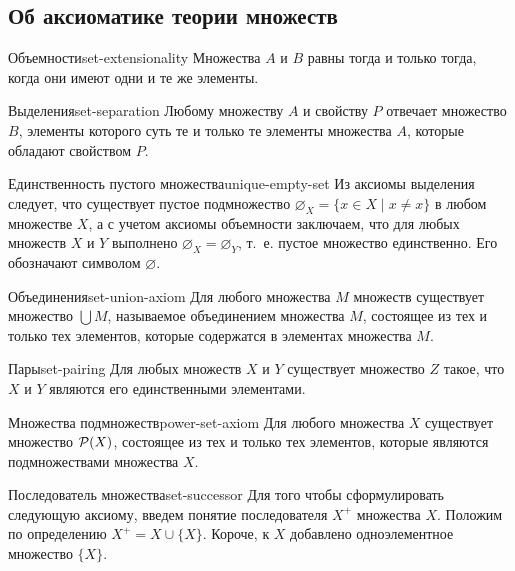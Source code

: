 \subsection{Об аксиоматике теории множеств}

\begin{axiom}{Объемности}{set-extensionality}
  Множества $A$ и $B$ равны тогда и только тогда, когда они имеют одни и те
  же элементы.
\end{axiom}

\begin{axiom}{Выделения}{set-separation}
  Любому множеству $A$ и свойству $P$ отвечает множество $B$, элементы
  которого суть те и только те элементы множества $A$, которые обладают
  свойством $P$.
\end{axiom}

\begin{corollary}{Единственность пустого множества}{unique-empty-set}
  Из аксиомы выделения следует, что существует пустое подмножество
  $\varnothing_X=\{x\in X\mid x\ne x\}$ в любом множестве $X$, а с учетом
  аксиомы объемности заключаем, что для любых множеств $X$ и $Y$ выполнено
  $\varnothing_X=\varnothing_Y$, т.~е. пустое множество единственно. Его
  обозначают символом $\varnothing$.
\end{corollary}

\begin{axiom}{Объединения}{set-union-axiom}
  Для любого множества $M$ множеств существует множество $\bigcup M$,
  называемое объединением множества $M$, состоящее из тех и только тех
  элементов, которые содержатся в элементах множества $M$.
\end{axiom}

\begin{axiom}{Пары}{set-pairing}
  Для любых множеств $X$ и $Y$ существует множество $Z$ такое, что $X$ и
  $Y$ являются его единственными элементами.
\end{axiom}

\begin{axiom}{Множества подмножеств}{power-set-axiom}
  Для любого множества $X$ существует множество $\mathcal{P}\!\left(X\right)$, состоящее
  из тех и только тех элементов, которые являются подмножествами множества
  $X$.
\end{axiom}

\begin{definition}{Последователь множества}{set-successor}
  Для того чтобы сформулировать следующую аксиому, введем понятие
  последователя $X^+$ множества $X$. Положим по определению
  $X^+=X\cup\{X\}$. Короче, к $X$ добавлено одноэлементное множество
  $\{X\}$.
\end{definition}

